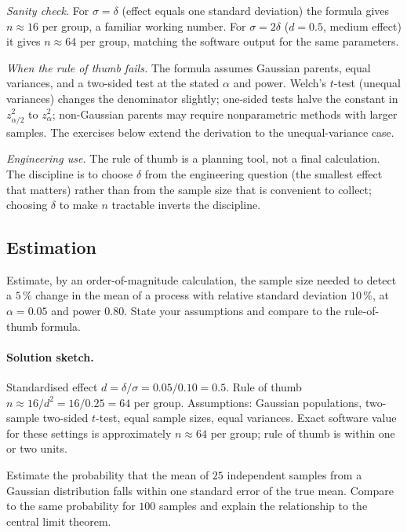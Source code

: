 \textit{Sanity check.} For $\sigma = \delta$ (effect equals one
standard deviation) the formula gives $n \approx 16$ per group, a
familiar working number. For $\sigma = 2\delta$ ($d = 0.5$,
medium effect) it gives $n \approx 64$ per group, matching the
software output for the same parameters.

\textit{When the rule of thumb fails.} The formula assumes Gaussian
parents, equal variances, and a two-sided test at the stated
$\alpha$ and power. Welch's $t$-test (unequal variances) changes
the denominator slightly; one-sided tests halve the constant in
$z_{\alpha/2}^{2}$ to $z_{\alpha}^{2}$; non-Gaussian parents may
require nonparametric methods with larger samples. The exercises
below extend the derivation to the unequal-variance case.

\textit{Engineering use.} The rule of thumb is a planning tool, not
a final calculation. The discipline is to choose $\delta$ from the
engineering question (the smallest effect that matters) rather
than from the sample size that is convenient to collect; choosing
$\delta$ to make $n$ tractable inverts the discipline.

\subsection*{Estimation}

\begin{exercise}
Estimate, by an order-of-magnitude calculation, the sample size
needed to detect a $5 \,\%$ change in the mean of a process with
relative standard deviation $10 \,\%$, at $\alpha = 0.05$ and
power $0.80$. State your assumptions and compare to the rule-of-
thumb formula.
\end{exercise}

\paragraph{Solution sketch.}
Standardised effect $d = \delta/\sigma = 0.05/0.10 = 0.5$. Rule of
thumb $n \approx 16/d^{2} = 16/0.25 = 64$ per group. Assumptions:
Gaussian populations, two-sample two-sided $t$-test, equal sample
sizes, equal variances. Exact software value for these settings is
approximately $n \approx 64$ per group; rule of thumb is within
one or two units.

\begin{exercise}
Estimate the probability that the mean of $25$ independent samples
from a Gaussian distribution falls within one standard error of the
true mean. Compare to the same probability for $100$ samples and
explain the relationship to the central limit theorem.
\end{exercise}


